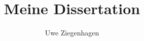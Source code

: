 \documentclass[ngerman,12pt]{scrartcl}
\author{Uwe Ziegenhagen}
\title{Meine Dissertation}
\begin{document}
\maketitle

\tableofcontents



\blindtext
\end{document}
